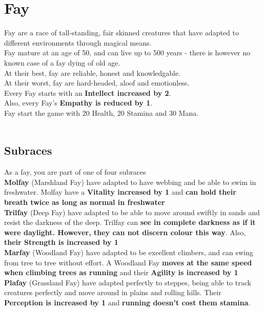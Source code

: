 \section{Fay}
Fay are a race of tall-standing, fair skinned creatures that have adapted to different environments through magical means.\\
Fay mature at an age of 50, and can live up to 500 years - there is however no known case of a fay dying of old age.\\
At their best, fay are reliable, honest and knowledgable.\\
At their worst, fay are hard-headed, aloof and emotionless.\\
Every Fay starts with an \textbf{Intellect increased by 2}.\\
Also, every Fay's \textbf{Empathy is reduced by 1}.\\
Fay start the game with 20 Health, 20 Stamina and 30 Mana.\\
\\ 
\subsection{Subraces}
As a fay, you are part of one of four subraces\\

\textbf{Molfay} (Marshland Fay) have adapted to have webbing and be able to swim in freshwater. Molfay have a \textbf{Vitality increased by 1} and \textbf{can hold their breath twice as long as normal in freshwater}\\


\textbf{Trilfay} (Deep Fay) have adapted to be able to move around swiftly in sands and resist the darkness of the deep. Trilfay can \textbf{see in complete darkness as if it were daylight. However, they can not discern colour this way}. Also, \textbf{their Strength is increased by 1}\\


\textbf{Marfay} (Woodland Fay) have adapted to be excellent climbers, and can swing from tree to tree without effort. A Woodland Fay \textbf{moves at the same speed when climbing trees as running} and their \textbf{Agility is increased by 1}\\


\textbf{Plafay} (Grassland Fay) have adapted perfectly to steppes, being able to track creatures perfectly and move around in plains and rolling hills. Their \textbf{Perception is increased by 1} and \textbf{running doesn't cost them stamina}.\\